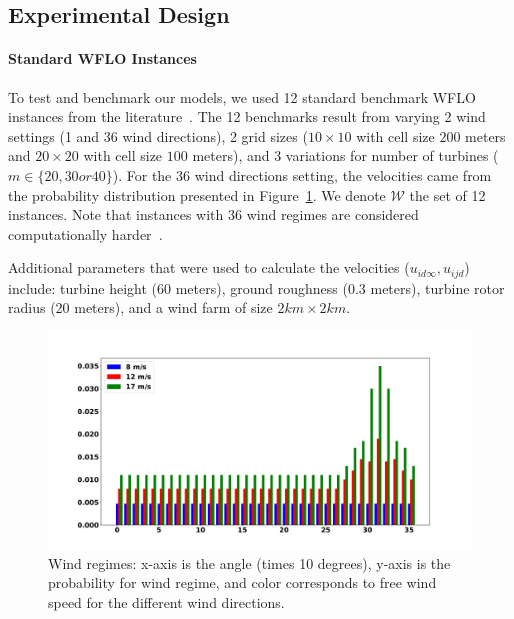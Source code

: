 \documentclass[preprint,12pt]{elsarticle}
\begin{document}
\subsection{Experimental Design}



\paragraph{Standard WFLO Instances}

To test and benchmark our models, we used 12 standard benchmark WFLO instances
from the literature~\cite{MOSETTI1994105,Zhang2014,grady2005placement}. 
The 12 benchmarks result from varying 2 wind settings (1 and 36 wind directions),
2 grid sizes ($10\times10$ with cell size $200$ meters and $20\times20$ with cell size $100$ meters),
and 3 variations for number of turbines ($m \in \{20, 30 or 40\}$). 
For the $36$ wind directions setting, the velocities came from the probability distribution presented in Figure~\ref{fig:prob_wind}. We denote $\mathcal{W}$ the set of 12 instances. Note that instances with $36$ wind regimes are considered computationally harder~\cite{Zhang2014}.

Additional parameters that were used to calculate 
the velocities ($u_{id\infty}, u_{ijd}$) include: turbine height ($60$ meters),
ground roughness ($0.3$ meters), turbine rotor radius ($20$ meters), and a wind farm of size $2km \times 2km$.


\begin{figure}[t]
	\centering
	\includegraphics[scale = 0.3]{prob_wind_pdf.pdf}
	
	\caption{Wind regimes: x-axis is the angle (times 10 degrees), y-axis is the probability for wind regime, and color corresponds to free wind speed for the different wind directions.}\label{fig:prob_wind}
\end{figure}
\end{document}
